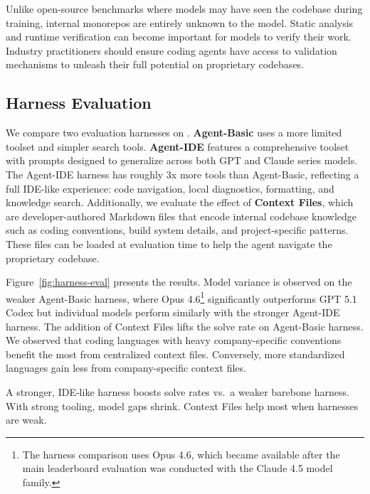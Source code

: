 \begin{insight}
Unlike open-source benchmarks where models may have seen the codebase during training, internal monorepos are entirely unknown to the model. Static analysis and runtime verification can become important for models to verify their work. Industry practitioners should ensure coding agents have access to validation mechanisms to unleash their full potential on proprietary codebases.
\end{insight}

\subsection{Harness Evaluation}
We compare two evaluation harnesses on \benchmark{}. \textbf{Agent-Basic} uses a more limited toolset and simpler search tools. \textbf{Agent-IDE} features a comprehensive toolset with prompts designed to generalize across both GPT and Claude series models. The Agent-IDE harness has roughly 3x more tools than Agent-Basic, reflecting a full IDE-like experience: code navigation, local diagnostics, formatting, and knowledge search. Additionally, we evaluate the effect of \textbf{Context Files}, which are developer-authored Markdown files that encode internal codebase knowledge such as coding conventions, build system details, and project-specific patterns. These files can be loaded at evaluation time to help the agent navigate the proprietary codebase.

Figure~\ref{fig:harness-eval} presents the results. Model variance is observed on the weaker Agent-Basic harness, where Opus 4.6\footnote{The harness comparison uses Opus 4.6, which became available after the main leaderboard evaluation was conducted with the Claude 4.5 model family.} significantly outperforms GPT 5.1 Codex but individual models perform similarly with the stronger Agent-IDE harness. The addition of Context Files lifts the solve rate on Agent-Basic harness. We observed that coding languages with heavy company-specific conventions benefit the most from centralized context files. Conversely, more standardized languages gain less from company-specific context files.

\begin{insight}
A stronger, IDE-like harness boosts solve rates vs.\ a weaker barebone harness. With strong tooling, model gaps shrink. Context Files help most when harnesses are weak.
\end{insight}

